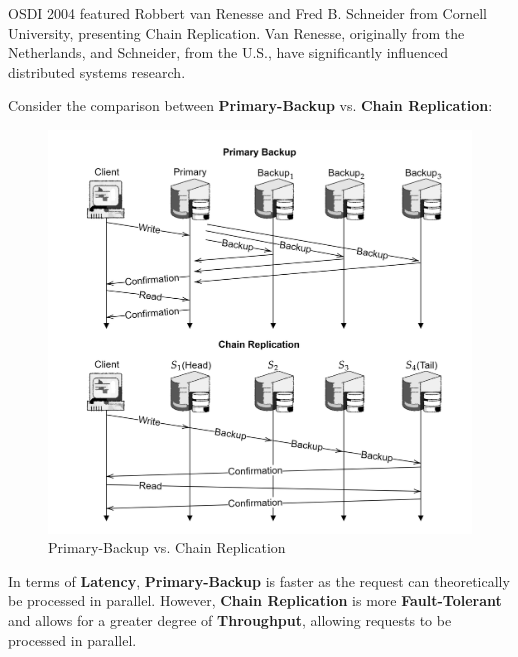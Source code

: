 \vspace{-1em}
\begin{Tip}  
    OSDI 2004 featured Robbert van Renesse and Fred B. Schneider from Cornell University, presenting Chain Replication. Van Renesse, originally from the Netherlands, and Schneider, from the U.S., have significantly influenced distributed systems research.  
    \end{Tip}
    
    
    
\noindent

Consider the comparison between \textbf{Primary-Backup} vs. \textbf{Chain Replication}:
\begin{figure}[h]
    \centering
    \includegraphics[width=1\textwidth]{Sections/rep/comp.png}
    \caption{Primary-Backup vs. Chain Replication}
\end{figure}

\begin{theo}

    In terms of \textbf{Latency}, \textbf{Primary-Backup} is faster as the request can theoretically be processed in parallel. 
    However, \textbf{Chain Replication} is more \textbf{Fault-Tolerant} and allows for a greater degree of \textbf{Throughput}, allowing 
    requests to be processed in parallel.
\end{theo}

